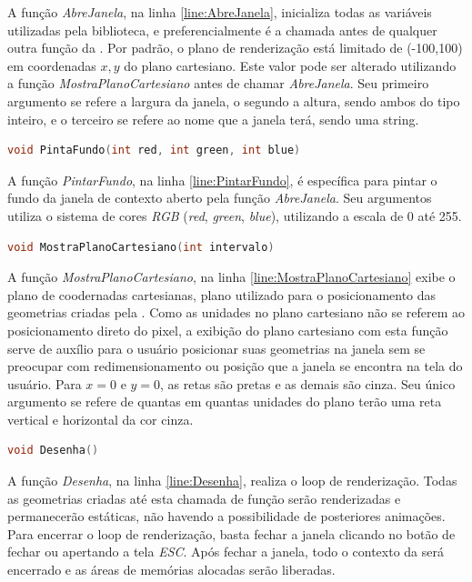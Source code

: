 A função \emph{AbreJanela}, na linha \ref{line:AbreJanela}, inicializa todas as variáveis utilizadas pela biblioteca, e preferencialmente é a chamada antes de qualquer outra função da \playAPC{}. Por padrão, o plano de renderização está limitado de (-100,100) em coordenadas $x,y$ do plano cartesiano. Este valor pode ser alterado utilizando a função \emph{MostraPlanoCartesiano} antes de chamar \emph{AbreJanela}.
Seu primeiro argumento se refere a largura da janela, o segundo a altura, sendo ambos do tipo inteiro, e o terceiro se refere ao nome que a janela terá, sendo uma string.


\begin{lstlisting}[label={func:PintarFundo},language=C++]
void PintaFundo(int red, int green, int blue)
\end{lstlisting}
A função \emph{PintarFundo}, na linha \ref{line:PintarFundo}, é específica para pintar o fundo da janela de contexto aberto pela função \emph{AbreJanela}. Seu argumentos utiliza o sistema de cores \emph{RGB} (\emph{red}, \emph{green}, \emph{blue}), utilizando a escala de 0 até 255.

\begin{lstlisting}[label={func:MostraPlanoCartesiano},language=C++]
void MostraPlanoCartesiano(int intervalo)
\end{lstlisting}
A função \emph{MostraPlanoCartesiano}, na linha \ref{line:MostraPlanoCartesiano} exibe o plano de coodernadas cartesianas, plano utilizado para o posicionamento das geometrias criadas pela \playAPC{}. Como as unidades no plano cartesiano não se referem ao posicionamento direto do pixel, a exibição do plano cartesiano com esta função serve de auxílio para o usuário posicionar suas geometrias na janela sem se preocupar com redimensionamento ou posição que a janela se encontra na tela do usuário. Para $x = 0$ e $y = 0$, as retas são pretas e as demais são cinza.
Seu único argumento se refere de quantas em quantas unidades do plano terão uma reta vertical e horizontal da cor cinza.

\begin{lstlisting}[label={func:Desenha},language=C++]
void Desenha()
\end{lstlisting}
A função \emph{Desenha}, na linha \ref{line:Desenha}, realiza o loop de renderização. Todas as geometrias criadas até esta chamada de função serão renderizadas e permanecerão estáticas, não havendo a possibilidade de posteriores animações.
Para encerrar o loop de renderização, basta fechar a janela clicando no botão de fechar ou apertando a tela \emph{ESC}. Após fechar a janela, todo o contexto da \playAPC{} será encerrado e as áreas de memórias alocadas serão liberadas.

